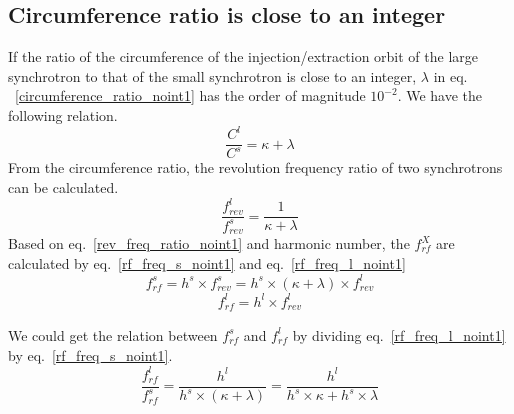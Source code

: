 \subsection{Circumference ratio is close to an integer}
If the ratio of the circumference of the injection/extraction orbit of the large synchrotron to that of the small synchrotron is  close to an integer, $\lambda$ in eq. ~\ref{circumference_ratio_noint1} has the order of magnitude $10^{-2}$. We have the following relation.
\begin{equation}
\frac{C^l}{C^s}= \kappa + \lambda \label{circumference_ratio_noint1}
\end{equation}
From the circumference ratio, the revolution frequency ratio of two synchrotrons can be calculated.
\begin{equation}
\frac{f_{\mathit{rev}}^{l}}{f_{\mathit{rev}}^{s}}=\frac{1}{ \kappa+ \lambda} \label{rev_freq_ratio_noint1}
\end{equation}
Based on eq.~\ref{rev_freq_ratio_noint1} and harmonic number, the $f_{\mathit{rf}}^{X}$ are calculated by eq.~\ref{rf_freq_s_noint1} and eq.~\ref{rf_freq_l_noint1}
\begin{equation} 
f_{\mathit{rf}}^{s}= h^s \times f_{\mathit{rev}}^{s}=h^s \times ( \kappa+ \lambda) \times f_{\mathit{rev}}^{l} \label{rf_freq_s_noint1}
\end{equation}
\begin{equation} 
f_{\mathit{rf}}^{l}= h^l \times f_{\mathit{rev}}^{l} \label{rf_freq_l_noint1}
\end{equation}

We could get the relation between $f_{\mathit{rf}}^{s}$ and $f_{\mathit{rf}}^{l}$ by dividing eq.~\ref{rf_freq_l_noint1} by eq.~\ref{rf_freq_s_noint1}.
\begin{equation} 
\frac{f_{\mathit{rf}}^{l}}{f_{\mathit{rf}}^{s}}=\frac{h^l}{h^s \times ( \kappa+ \lambda)}=\frac{h^l}{h^s \times  \kappa+ h^s \times \lambda}\label{close_to_interger_31}
\end{equation}

